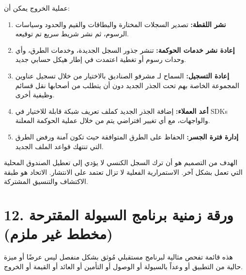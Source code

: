 \documentclass[11pt]{article}
\begin{document}
عملية الخروج يمكن أن:

\begin{enumerate}[leftmargin=*]
\item \textbf{نشر اللقطة:} تصدير السجلات المختارة والبطاقات والقيم والحدود وسياسات الرسوم، ثم نشر شريط سريع تم توقيعه.
\item \textbf{إعادة نشر خدمات الحوكمة:} تنشر جذور السجل الجديدة، وخدمات الطرق، وأي وحدات رسوم أو تغطية اعتمدت في إطار هيكل حسابي جديد.
\item \textbf{إعادة التسجيل:} السماح لـ مشرفو الصناديق بالاختيار من خلال تسجيل عناوين المجموعة الخاصة بهم تحت الجذر الجديد دون أن يتطلب من أصحابها نقل قسائم وظيفية أخرى.
\item \textbf{أعد العملاء:} إضافة الجذر الجديد كملف تعريف شبكة قابلة للاختيار في SDKs والواجهات، مع أي تغيير افتراضي يتم من خلال عملية الحوكمة المعلنة.
\item \textbf{إدارة فترة الجسر:} الحفاظ على الطرق المتوافقة حيث تكون آمنة ورفض الطرق التي تنتهك قواعد الملف الجديد.
\end{enumerate}
الهدف من التصميم هو أن ترك السجل الكنسي لا يؤدي إلى تعطيل الصندوق المحلية التي تعمل بشكل آخر. الاستمرارية الفعلية لا تزال تعتمد على الانتشار. الاتحاد هو طبقة الاكتشاف والتنسيق المشتركة.


\section*{12. ورقة زمنية برنامج السيولة المقترحة (مخطط غير ملزم)}

هذه قائمة تفحص مثالية لبرنامج مستقبلي مُوثق بشكل منفصل ليس عرضًا أو ميزة حالية من التطبيق أو وعداً بالسيولة أو الوصول أو التأمين أو العائد أو القيمة أو الخروج.
\end{document}
